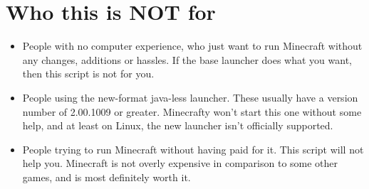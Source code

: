 \documentclass[10pt,a4paper]{book}
\begin{document}
\section*{Who this is NOT for}
\begin{itemize}
\item People with no computer experience, who just want to run Minecraft without
  any changes, additions or hassles. If the base launcher does what you want, then
  this script is not for you.
\item People using the new-format java-less launcher. These usually have a
  version number of 2.00.1009 or greater. Minecrafty won't start this one without
  some help, and at least on Linux, the new launcher isn't officially supported.
\item People trying to run Minecraft without having paid for it. This script
  will not help you. Minecraft is not overly expensive in comparison to some
  other games, and is most definitely worth it.
\end{itemize}
\end{document}
